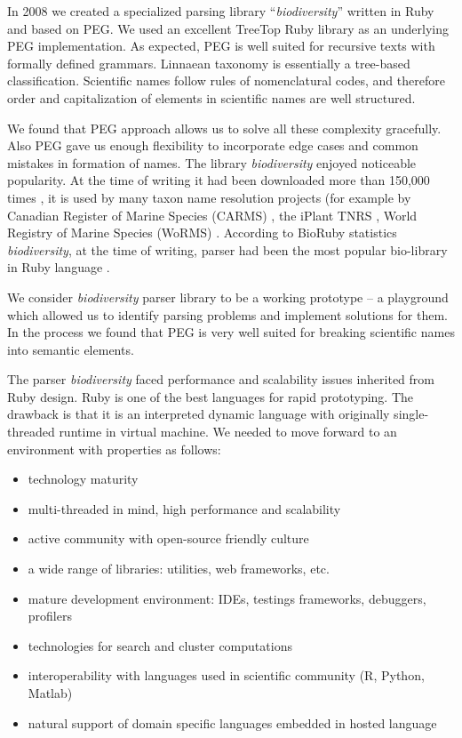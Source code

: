\documentclass{bmcart}
\begin{document}
In 2008 we created a specialized parsing library ``\textit{biodiversity}''
\cite{biodiversity} written in Ruby and based on PEG. We used an excellent
TreeTop Ruby library \cite{treetop} as an underlying PEG implementation. As
expected, PEG is well suited for recursive texts with formally defined
grammars. Linnaean taxonomy is essentially a tree-based classification.
Scientific names follow rules of nomenclatural codes, and therefore order and
capitalization of elements in scientific names are well structured.

We found that PEG approach allows us to solve all these complexity gracefully.
Also PEG gave us enough flexibility to incorporate edge cases and common
mistakes in formation of names. The library \textit{biodiversity} enjoyed
noticeable popularity. At the time of writing it had been downloaded more than
150,000 times \cite{bdiv_downloads}, it is used by many taxon name resolution
projects (for example by Canadian Register of Marine Species (CARMS)
\cite{carms}, the iPlant TNRS \cite{iplant}, World Registry of Marine Species
(WoRMS) \cite{worms}.  According to BioRuby statistics \textit{biodiversity},
at the time of writing, parser had been the most popular bio-library in Ruby
language \cite{biogems}.

We consider \textit{biodiversity} parser library to be a working prototype --
a playground which allowed us to identify parsing problems and implement
solutions for them. In the process we found that PEG is very well suited for
breaking scientific names into semantic elements.

The parser \textit{biodiversity} faced performance and scalability issues
inherited from Ruby design. Ruby is one of the best languages for rapid
prototyping. The drawback is that it is an interpreted dynamic language with
originally single-threaded runtime in virtual machine. We needed to move
forward to an environment with properties as follows:

\begin{itemize}
    \item technology maturity
    \item multi-threaded in mind, high performance and scalability
    \item active community with open-source friendly culture
    \item a wide range of libraries: utilities, web frameworks, etc.
    \item mature development environment: IDEs, testings frameworks,
    debuggers, profilers
    \item technologies for search and cluster computations
    \item interoperability with languages used in scientific community (R,
    Python, Matlab)
    \item natural support of domain specific languages embedded in hosted
    language
\end{itemize}
\end{document}

